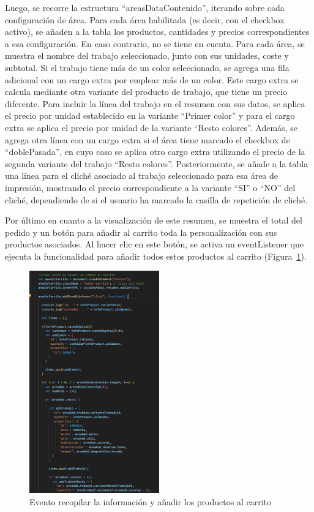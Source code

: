 \documentclass[11pt]{article}
\begin{document}
Luego, se recorre la estructura ``areasDataContenido'', iterando sobre cada configuración de área. Para cada área habilitada 
(es decir, con el checkbox activo), se añaden a la tabla los productos, cantidades y precios correspondientes a esa configuración.
En caso contrario, no se tiene en cuenta. Para cada área, se muestra el nombre del trabajo seleccionado, junto con sus unidades, 
coste y subtotal. Si el trabajo tiene más de un color seleccionado, se agrega una fila adicional con un cargo extra por emplear 
más de un color. Este cargo extra se calcula mediante otra variante del producto de trabajo, que tiene un precio diferente. 
Para incluir la línea del trabajo en el resumen con sus datos, se aplica el precio por unidad establecido en la variante 
``Primer color'' y para el cargo extra se aplica el precio por unidad de la variante ``Resto colores''. Además, 
se agrega otra línea con un cargo extra si el área tiene marcado el checkbox de ``doblePasada'', en cuyo caso se aplica 
otro cargo extra utilizando el precio de la segunda variante del trabajo ``Resto colores''. Posteriormente, se añade a la tabla 
una línea para el cliché asociado al trabajo seleccionado para esa área de impresión, mostrando el precio correspondiente a la 
variante ``SI'' o ``NO'' del cliché, dependiendo de si el usuario ha marcado la casilla de repetición de cliché.

Por último en cuanto a la visualización de este resumen, se muestra el total del pedido y un botón para añadir al carrito toda la personalización 
con sus productos asociados. Al hacer clic en este botón, se activa un eventListener que ejecuta la funcionalidad para añadir todos estos 
productos al carrito (Figura~\ref{fig:addCarritoEvento}). 


\begin{figure}[H]
    \centering
    \includegraphics[width=0.5\textwidth]{imagenesUS3-modal/AnadirCarritoParte1addEventListenerCracionBoton.png}
    \caption{\label{fig:addCarritoEvento} Evento recopilar la información y añadir los productos al carrito}
    \vspace{\fill}
\end{figure}
\end{document}
